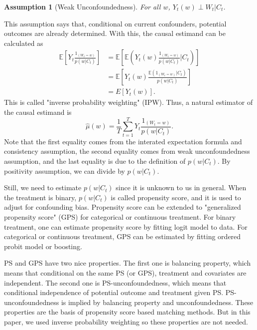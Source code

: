 \documentclass[12pt]{article}
\newtheorem{asm}{Assumption}
\begin{document}
\begin{asm}[Weak Unconfoundedness] \hfill

	For all $w$, $Y_{t}(w) \perp W_t \lvert C_t$.
\end{asm}
This assumption says that, conditional on current confounders, potential outcomes are already determined.
With this, the causal estimand can be calculated as
\[
	\begin{split}
		\mathbb{E}\left[ Y_t\frac{1_{(W_t = w)}}{p(w\lvert C_t)} \right]
		& = \mathbb{E}\left[ \mathbb{E}\left( Y_t(w) \frac{1_{(W_t = w)}}{p(w\lvert C_t)} \lvert C_t\right)\right]\\
		& = \mathbb{E}\left[ Y_t(w)\frac{\mathbb{E}\left( 1_{(W_t = w)}\lvert C_t \right)}{p(w\lvert C_t)} \right]\\
		& = E\left[ Y_t(w) \right].
	\end{split}
\]
This is called "inverse probability weighting" (IPW).
Thus, a natural estimator of the causal estimand is
\[
	\hat{\mu}(w) = \frac{1}{T}\sum_{t = 1}^T Y_t \frac{1_{(W_t = w)}}{p(w\lvert C_t)}.	
\]
Note that the first equality comes from the interated expectation formula and consistency assumption,
the second equality comes from weak unconfoundedness assumption,
and the last equality is due to the definition of $p(w\lvert C_t)$.
By positivity assumption, we can divide by $p(w\lvert C_t)$.

Still, we need to estimate $p(w\lvert C_t)$ since it is unknown to us in general.
When the treatment is binary, $p(w\lvert C_t)$ is called propensity score,
and it is used to adjust for confounding bias\cite{rosenbaum1983}.
Propensity score can be extended to 
"generalized propensity score" (GPS) for categorical or continuous treatment\cite{imbens2000}.
For binary treatment, one can estimate propensity score by fitting logit model to data.
For categorical or continuous treatment, GPS can be estimated by fitting ordered probit model or boosting.

PS and GPS have two nice properties\cite{rosenbaum1983, hirano2004}.
The first one is balancing property, which means that conditional on the same PS (or GPS),
treatment and covariates are independent.
The second one is PS-unconfoundedness, 
which means that conditional independence of potential outcome and treatment given PS.
PS-unconfoundedness is implied by balancing property and unconfoundedness.
These properties are the basis of propensity score based matching methods.
But in this paper, we used inverse probability weighting so these properties are not needed.
\end{document}
